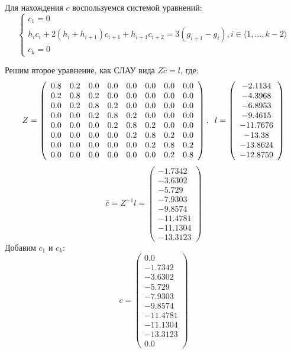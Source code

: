 \documentclass[12pt]{article}
\begin{document}
Для нахождения $c$ воспользуемся системой уравнений:
$$
\begin{cases}
	c_1 = 0 \\
	h_i c_i + 2(h_i + h_{i+1})c_{i+1} + h_{i+1} c_{i+2} = 3(g_{i+1} - g_i),  i \in \langle 1, \ldots, k - 2 \rangle \\
	c_k = 0
\end{cases}
$$

Решим второе уравнение, как СЛАУ вида $Z \hat c = l$, где:
$$
Z = \left(
\begin{array}{ccccccccccc}
	0.8 & 0.2 & 0.0 & 0.0 & 0.0 & 0.0 & 0.0 & 0.0 \\
	0.2 & 0.8 & 0.2 & 0.0 & 0.0 & 0.0 & 0.0 & 0.0 \\
	0.0 & 0.2 & 0.8 & 0.2 & 0.0 & 0.0 & 0.0 & 0.0 \\
	0.0 & 0.0 & 0.2 & 0.8 & 0.2 & 0.0 & 0.0 & 0.0 \\
	0.0 & 0.0 & 0.0 & 0.2 & 0.8 & 0.2 & 0.0 & 0.0 \\
	0.0 & 0.0 & 0.0 & 0.0 & 0.2 & 0.8 & 0.2 & 0.0 \\
	0.0 & 0.0 & 0.0 & 0.0 & 0.0 & 0.2 & 0.8 & 0.2 \\
	0.0 & 0.0 & 0.0 & 0.0 & 0.0 & 0.0 & 0.2 & 0.8 \\
\end{array}
\right), \hspace{0.2 cm}
l = 
\left(
\begin{array}{c}
	-2.1134 \\ -4.3968 \\ -6.8953 \\ -9.4615 \\ -11.7676 \\ -13.38 \\ -13.8624 \\ -12.8759 
\end{array}
\right)
$$
$$\hat c = Z^{-1}l = 
\left(
\begin{array}{c}
	-1.7342 \\ -3.6302 \\ -5.729 \\ -7.9303 \\ -9.8574 \\ -11.4781 \\ -11.1304 \\ -13.3123 
\end{array}
\right)
$$
Добавим $c_1$ и $c_k$:
$$
c = 
\left(
\begin{array}{c}
	0.0 \\ -1.7342 \\ -3.6302 \\ -5.729 \\ -7.9303 \\ -9.8574 \\ -11.4781 \\ -11.1304 \\ -13.3123 \\ 0.0
\end{array}
\right)
$$
\end{document}
